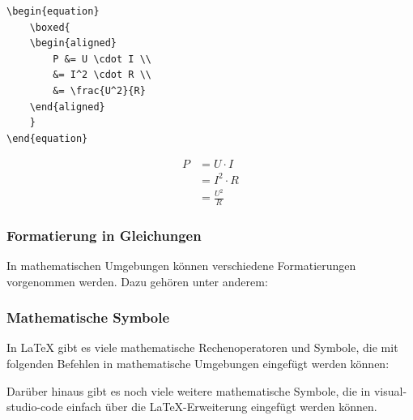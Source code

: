 \begin{minipage}{0.5\textwidth}
    \begin{lstlisting}[language={[LaTeX]TeX}]
\begin{equation}
    \boxed{
    \begin{aligned}
        P &= U \cdot I \\
        &= I^2 \cdot R \\
        &= \frac{U^2}{R}
    \end{aligned}
    }
\end{equation}
\end{lstlisting}
\end{minipage}
\hfill
\begin{minipage}{0.5\textwidth}
    \begin{equation}
        \boxed{
            \begin{aligned}
                P & = U \cdot I     \\
                  & = I^2 \cdot R   \\
                  & = \frac{U^2}{R}
            \end{aligned}
        }
    \end{equation}
\end{minipage}

\newpage

\subsubsection{Formatierung in Gleichungen}
In mathematischen Umgebungen können verschiedene Formatierungen vorgenommen werden. Dazu gehören unter anderem:



\vspace{0.5cm}

\subsubsection{Mathematische Symbole}
In \LaTeX{} gibt es viele mathematische Rechenoperatoren und Symbole, die mit folgenden Befehlen in mathematische Umgebungen eingefügt werden können:



Darüber hinaus gibt es noch viele weitere mathematische Symbole, die in visual-studio-code einfach über die \LaTeX{}-Erweiterung eingefügt werden können.

